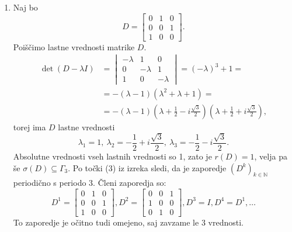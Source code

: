 \documentclass[mat1]{fmfdelo}
\newcommand{\N}{\mathbb N}
\begin{document}
\begin{zgled}
\begin{enumerate}
        \item Naj bo
        \begin{equation*}
            D =
            \begin{bmatrix}
                0 & 1 & 0 \\
                0 & 0 & 1 \\
                1 & 0 & 0
            \end{bmatrix}.
        \end{equation*}
        Poiščimo lastne vrednosti matrike $D$.
        \begin{align*}
            \det (D - \lambda I) &=
            \begin{vmatrix}
                -\lambda & 1 & 0 \\
                0 & -\lambda & 1 \\
                1 & 0 & -\lambda
            \end{vmatrix}
            = (-\lambda)^3 + 1 = \\
            &= -(\lambda - 1)(\lambda^2+\lambda+1) = \\
            &= -(\lambda - 1)\left(\lambda + \frac{1}{2} - i\frac{\sqrt{3}}{2}\right)\left(\lambda + \frac{1}{2} + i\frac{\sqrt{3}}{2}\right),
        \end{align*}
        torej ima $D$ lastne vrednosti \[\lambda_1=1,\ \lambda_2 = - \frac{1}{2} + i\frac{\sqrt{3}}{2},\ \lambda_3 = - \frac{1}{2} - i\frac{\sqrt{3}}{2}.\] Absolutne vrednosti vseh lastnih vrednosti so 1, zato je $r(D) = 1$, velja pa še $\sigma(D) \subseteq \Gamma_3$. Po točki (3) iz izreka sledi, da je zaporedje $(D^k)_{k\in\N}$ periodično s periodo $3$. Členi zaporedja so:
        \begin{equation*}
            D^1 =
            \begin{bmatrix}
                0 & 1 & 0 \\
                0 & 0 & 1 \\
                1 & 0 & 0
            \end{bmatrix},
            D^2 = 
            \begin{bmatrix}
                0 & 0 & 1 \\
                1 & 0 & 0 \\
                0 & 1 & 0
            \end{bmatrix},
            D^3 = I, D^4 = D^1, \ldots
        \end{equation*}
        To zaporedje je očitno tudi omejeno, saj zavzame le $3$ vrednosti.
    \end{enumerate}
\end{zgled}
\end{document}
